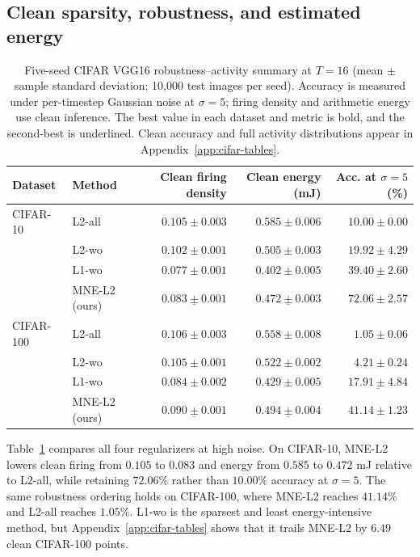 \documentclass{article}
\begin{document}
\subsection{Clean sparsity, robustness, and estimated energy}

\begin{table}[t]
\caption{Five-seed CIFAR VGG16 robustness--activity summary at $T=16$ (mean $\pm$ sample standard deviation; 10,000 test images per seed). Accuracy is measured under per-timestep Gaussian noise at $\sigma=5$; firing density and arithmetic energy use clean inference. The best value in each dataset and metric is bold, and the second-best is underlined. Clean accuracy and full activity distributions appear in Appendix~\ref{app:cifar-tables}.}
\label{tab:cifar-deployment-main}
\centering
\scriptsize
\setlength{\tabcolsep}{4.5pt}
\begin{tabular}{llrrr}
\toprule
Dataset & Method & Clean firing density & Clean energy (mJ) & Acc. at $\sigma=5$ (\%) \\
\midrule
CIFAR-10  & L2-all & $0.105\pm0.003$ & $0.585\pm0.006$ & $10.00\pm0.00$ \\
          & L2-wo  & $0.102\pm0.001$ & $0.505\pm0.003$ & $19.92\pm4.29$ \\
          & L1-wo  & $\mathbf{0.077\pm0.001}$ & $\mathbf{0.402\pm0.005}$ & $\underline{39.40\pm2.60}$ \\
          & MNE-L2 (ours) & $\underline{0.083\pm0.001}$ & $\underline{0.472\pm0.003}$ & $\mathbf{72.06\pm2.57}$ \\
\midrule
CIFAR-100 & L2-all & $0.106\pm0.003$ & $0.558\pm0.008$ & $1.05\pm0.06$ \\
          & L2-wo  & $0.105\pm0.001$ & $0.522\pm0.002$ & $4.21\pm0.24$ \\
          & L1-wo  & $\mathbf{0.084\pm0.002}$ & $\mathbf{0.429\pm0.005}$ & $\underline{17.91\pm4.84}$ \\
          & MNE-L2 (ours) & $\underline{0.090\pm0.001}$ & $\underline{0.494\pm0.004}$ & $\mathbf{41.14\pm1.23}$ \\
\bottomrule
\end{tabular}
\end{table}

Table~\ref{tab:cifar-deployment-main} compares all four regularizers at high noise. On CIFAR-10, MNE-L2 lowers clean firing from $0.105$ to $0.083$ and energy from $0.585$ to $0.472$ mJ relative to L2-all, while retaining $72.06\%$ rather than $10.00\%$ accuracy at $\sigma=5$. The same robustness ordering holds on CIFAR-100, where MNE-L2 reaches $41.14\%$ and L2-all reaches $1.05\%$. L1-wo is the sparsest and least energy-intensive method, but Appendix~\ref{app:cifar-tables} shows that it trails MNE-L2 by $6.49$ clean CIFAR-100 points.
\end{document}
